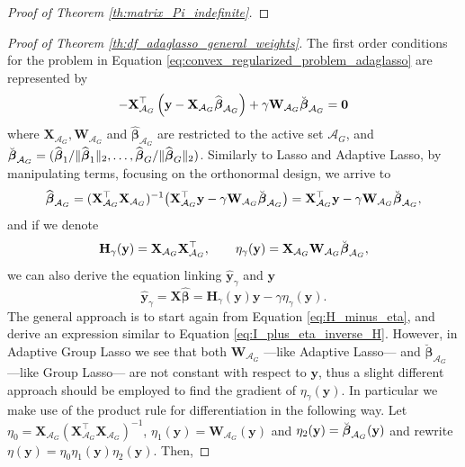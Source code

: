 \documentclass[a4paper, 12pt]{article}
\newcommand{\Aset}{\mathcal{A}}
\newcommand{\betahat}{\widehat{\boldsymbol\beta}}
\newcommand{\T}{\top}
\def\bbeta{\boldsymbol{\beta}}
\def\by{\boldsymbol{y}}
\def\bH{\mathbf{H}}
\def\bW{\mathbf{W}}
\def\bX{\mathbf{X}}
\def\by{\mathbf{y}}
\begin{document}
\begin{appendix}
\begin{proof}[Proof of Theorem \ref{th:matrix_Pi_indefinite}]
\end{proof}
%
\begin{proof}[Proof of Theorem \ref{th:df_adaglasso_general_weights}]
The first order conditions for the problem in Equation \eqref{eq:convex_regularized_problem_adaglasso} are represented by
\begin{equation*}
-\bX_{\Aset_G}^{\T}\left(\by-\bX_{\Aset_G}\betahat_{\Aset_G}\right)+\gamma \bW_{\Aset_G}\Breve{\bbeta}_{\Aset_G}=\boldsymbol{0} 
\end{equation*}
where $\bX_{\Aset_G}, \bW_{\Aset_G}$ and $\widehat{\bbeta}_{\Aset_G}$ are restricted to the active set $\Aset_G$, and $\Breve{\bbeta}_{\Aset_G} = (\widehat{\bbeta}_1 / \lVert \widehat{\bbeta}_1 \rVert_2, %
\ldots, \widehat{\bbeta}_G / \lVert \widehat{\bbeta}_G \rVert_2)$. Similarly to Lasso and Adaptive Lasso, by manipulating terms, focusing on the orthonormal design, we arrive to
\begin{equation*}
\betahat_{\Aset_G} = (\bX_{\Aset_G}^{{\T}} \bX_{\Aset_G})^{-1} \big(\bX_{\Aset_G}^{\T} \by - \gamma\bW_{\Aset_G}\Breve{\bbeta}_{\Aset_G} \big) = \bX_{\Aset_G}^{\T} \by - \gamma\bW_{\Aset_G}\Breve{\bbeta}_{\Aset_G},
\end{equation*}
and if we denote
\begin{equation*}
\bH_\gamma(\by)=\bX_{\Aset_G} \bX_{\Aset_G}^{\T},\qquad
\eta_\gamma(\by)=\bX_{\Aset_G} \bW_{\Aset_G}\Breve{\bbeta}_{\Aset_G},
\end{equation*}
we can also derive the equation linking $\widehat{\by}_\gamma$ and $\by$
\begin{equation*}
\widehat{\by}_\gamma=\bX\betahat=\bH_\gamma(\by)\by-\gamma\eta_\gamma(\by).
\end{equation*}
The general approach is to start again from Equation \eqref{eq:H_minus_eta}, and derive an expression similar to Equation \eqref{eq:I_plus_eta_inverse_H}. However,
in Adaptive Group Lasso we see that both $\bW_{\Aset_G}$ ---like Adaptive Lasso--- and $\breve{\bbeta}_{\Aset_G}$ ---like Group Lasso--- are not constant with respect to $\by$, thus a slight different approach should be employed to find the gradient of $\eta_\gamma(\by)$. In particular we make use of the product rule for differentiation in the following way. Let $\eta_0 = \bX_{\Aset_G}(\bX_{\Aset_G}^{{\T}} \bX_{\Aset_G})^{-1} $, $\eta_1(\by) = \bW_{\Aset_G}(\by)$ and $\eta_2(\by) = \Breve{\bbeta}_{\Aset_G}(\by)$ and rewrite $\eta(\by) = \eta_0 \eta_1(\by)\eta_2(\by)$. Then,

\end{proof}
\end{appendix}
\end{document}

